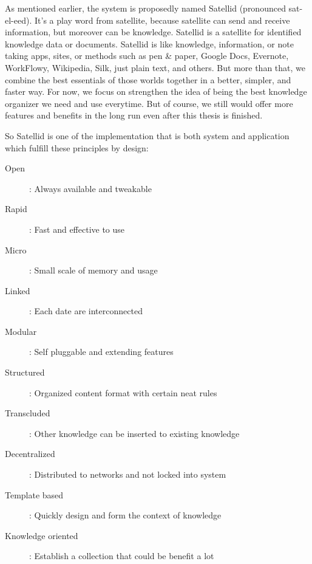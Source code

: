 As mentioned earlier, the system is proposedly named Satellid (pronounced sat-el-eed). It's a play word from satellite, because satellite can send and receive information, but moreover can be knowledge. Satellid is a satellite for identified knowledge data or documents.
Satellid is like knowledge, information, or note taking apps, sites, or methods such as pen \& paper, Google Docs, Evernote, WorkFlowy, Wikipedia, Silk, just plain text, and others.
But more than that, we combine the best essentials of those worlds together in a better, simpler, and faster way.
For now, we focus on strengthen the idea of being the best knowledge organizer we need and use everytime.
But of course, we still would offer more features and benefits in the long run even after this thesis is finished.

So Satellid is one of the implementation that is both system and application which fulfill these principles by design:

\begin{description}
\item [Open]: Always available and tweakable
\item [Rapid]: Fast and effective to use
\item [Micro]: Small scale of memory and usage
\item [Linked]: Each date are interconnected
\item [Modular]: Self pluggable and extending features
\item [Structured]: Organized content format with certain neat rules
\item [Transcluded]: Other knowledge can be inserted to existing knowledge
\item [Decentralized]: Distributed to networks and not locked into system
\item [Template based]: Quickly design and form the context of knowledge
\item [Knowledge oriented]: Establish a collection that could be benefit a lot
\end{description}
